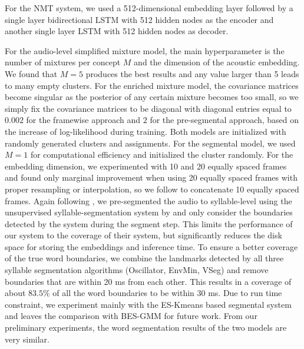 \documentclass[journal]{IEEEtran}
\begin{document}
For the NMT system, we used a 512-dimensional embedding layer followed by a single layer bidirectional LSTM with 512 hidden nodes as the encoder and another single layer LSTM with 512 hidden nodes as decoder. %

For the audio-level simplified mixture model, the main hyperparameter is the number of mixtures per concept $M$ and the dimension of the acoustic embedding. We found that $M=5$ produces the best results and any value larger than 5 leads to many empty clusters. For the enriched mixture model, the covariance matrices become singular as the posterior of any certain mixture becomes too small, so we simply fix the covariance matrices to be diagonal with diagonal entries equal to $0.002$ for the framewise approach and $2$ for the pre-segmental approach, based on the increase of log-likelihood during training. Both models are initialized with randomly generated clusters and assignments. For the segmental model, we used $M=1$ for computational efficiency and initialized the cluster randomly. For the embedding dimension, we experimented with 10 and 20 equally spaced frames and found only marginal improvement when using 20 equally spaced frames  with proper resampling or interpolation, so we follow \cite{Kamper2017} to concatenate 10 equally spaced frames. 
Again following \cite{Kamper2016}, we pre-segmented the audio to syllable-level using the unsupervised syllable-segmentation system by \cite{Rasanen2015} and only consider the boundaries detected by the system during the segment step. This limits the performance of our system to the coverage of their system, but significantly reduces the disk space for storing the embeddings and inference time. To ensure a better coverage of the true word boundaries, we combine the landmarks detected by all three syllable segmentation algorithms (Oscillator, EnvMin, VSeg) \cite{Rasanen2015} and remove boundaries that are within 20 ms from each other. This results in a coverage of about $83.5 \%$ of all the word boundaries to be within 30 ms. Due to run time constraint, we experiment mainly with the ES-Kmeans based segmental system and leaves the comparison with BES-GMM for future work. From our preliminary experiments, the word segmentation results of the two models are very similar.
\end{document}

